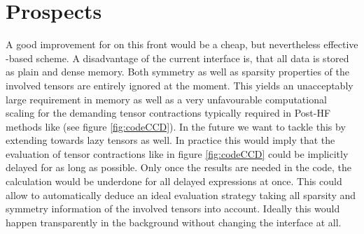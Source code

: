 \chapter{Prospects}
\label{ch:Prospects}


%







A good improvement for \molsturm on this front would be a cheap,
but nevertheless effective \contraction-based \SCF scheme.
%
%
A disadvantage of the current \molsturm interface is,
that all data is stored as plain and dense memory.
Both symmetry as well as sparsity properties of the involved tensors
are entirely ignored at the moment.
This yields an unacceptably large requirement in memory
as well as a very unfavourable computational scaling
for the demanding tensor contractions
typically required in Post-HF methods like \CCD (see figure \ref{fig:codeCCD}).
In the future we want to tackle this by extending
\lazyten towards lazy tensors as well.
In practice this would imply that the evaluation of
tensor contractions like in figure \ref{fig:codeCCD} could be implicitly delayed
for as long as possible.
Only once the results are needed in the code,
the calculation would be underdone
for all delayed expressions at once.
This could allow to automatically deduce an ideal evaluation strategy
taking all sparsity and symmetry information
of the involved tensors into account.
Ideally this would happen transparently in the background
without changing the \python interface at all.

